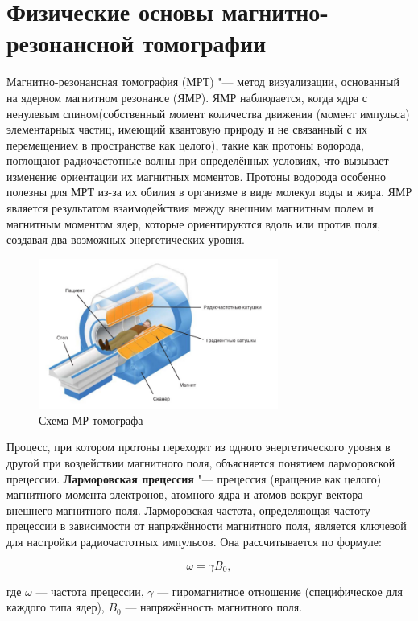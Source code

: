 \section{Физические основы магнитно-резонансной томографии}

Магнитно-резонансная томография (МРТ) "--- метод визуализации, основанный на ядерном магнитном резонансе (ЯМР). ЯМР наблюдается, когда ядра с ненулевым спином(собственный момент количества движения (момент импульса) элементарных частиц, имеющий квантовую природу и не связанный с их перемещением в пространстве как целого), такие как протоны водорода, поглощают радиочастотные волны при определённых условиях, что вызывает изменение ориентации их магнитных моментов. Протоны водорода особенно полезны для МРТ из-за их обилия в организме в виде молекул воды и жира. ЯМР является результатом взаимодействия между внешним магнитным полем и магнитным моментом ядер, которые ориентируются вдоль или против поля, создавая два возможных энергетических уровня\cite{ktmrt}.

\begin{figure}[H]
    \centering
    \includegraphics[width=0.7\textwidth]{pic/8.png}
    \caption{Схема МР-томографа}
    \label{fig:image1}
\end{figure}

Процесс, при котором протоны переходят из одного энергетического уровня в другой при воздействии магнитного поля, объясняется понятием ларморовской прецессии.
\textbf{Ларморовская прецессия} "--- прецессия (вращение как целого) магнитного момента электронов, атомного ядра и атомов вокруг вектора внешнего магнитного поля. Ларморовская частота, определяющая частоту прецессии в зависимости от напряжённости магнитного поля, является ключевой для настройки радиочастотных импульсов. Она рассчитывается по формуле:

\[
\omega = \gamma B_0,
\]

где \(\omega\) — частота прецессии, \(\gamma\) — гиромагнитное отношение (специфическое для каждого типа ядер), \(B_0\) — напряжённость магнитного поля. 

